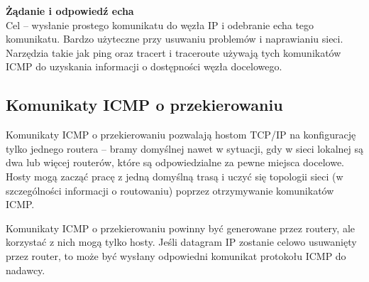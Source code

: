 \documentclass[../main.tex]{subfiles}
\begin{document}
    \textbf{Żądanie i odpowiedź echa}\\
    Cel – wysłanie prostego komunikatu do węzła IP i odebranie echa tego komunikatu. Bardzo
    użyteczne przy usuwaniu problemów i naprawianiu sieci. Narzędzia takie jak ping oraz tracert i traceroute używają tych komunikatów ICMP do
    uzyskania informacji o dostępności węzła docelowego.\\

    \subsection{Komunikaty ICMP o przekierowaniu}
    Komunikaty ICMP o przekierowaniu pozwalają hostom TCP/IP na konfigurację tylko jednego
    routera – bramy domyślnej nawet w sytuacji, gdy w sieci lokalnej są dwa lub więcej
    routerów, które są odpowiedzialne za pewne miejsca docelowe.
    Hosty mogą zacząć pracę z jedną domyślną trasą i uczyć się topologii sieci (w szczególności
    informacji o routowaniu) poprzez otrzymywanie komunikatów ICMP.

    Komunikaty ICMP o przekierowaniu powinny być generowane przez routery, ale korzystać z
    nich mogą tylko hosty.
    Jeśli datagram IP zostanie celowo usuwanięty przez router, to może być wysłany odpowiedni komunikat protokołu ICMP do nadawcy.
\end{document}
